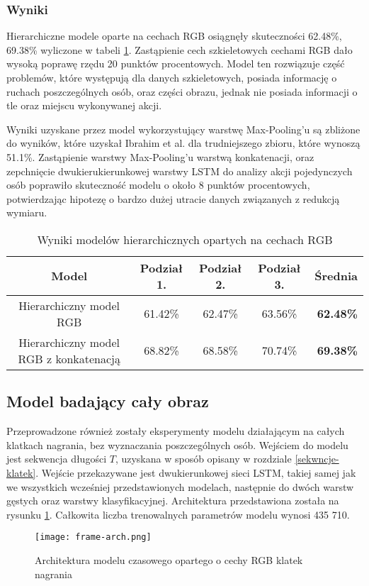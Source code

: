 \subsubsection{Wyniki}
Hierarchiczne modele oparte na cechach RGB osiągnęły skuteczności 62.48\%, 69.38\% wyliczone w tabeli \ref{tab:hier-rgb-wyniki}. Zastąpienie cech szkieletowych cechami RGB dało wysoką poprawę rzędu 20 punktów procentowych. Model ten rozwiązuje część problemów, które występują dla danych szkieletowych, posiada informację o ruchach poszczególnych osób, oraz części obrazu, jednak nie posiada informacji o tle oraz miejscu wykonywanej akcji. 

Wyniki uzyskane przez model wykorzystujący warstwę Max-Pooling'u są zbliżone do wyników, które uzyskał Ibrahim et al. \cite{Ibrahim2015} dla trudniejszego zbioru, które wynoszą 51.1\%. Zastąpienie warstwy Max-Pooling'u warstwą konkatenacji, oraz zepchnięcie dwukierukierunkowej warstwy LSTM do analizy akcji pojedynczych osób poprawiło skuteczność modelu o około 8 punktów procentowych, potwierdzając hipotezę o bardzo dużej utracie danych związanych z redukcją wymiaru. 
\begin{table}[!h] \centering
\caption{Wyniki modelów hierarchicznych opartych na cechach RGB}
\begin{tabular} {| c | c | c | c | r |} \hline
    Model & Podział 1.  & Podział 2. & Podział 3. & \textbf{Średnia} \\ \hline\hline
    Hierarchiczny model RGB &  61.42\%	& 62.47\%	& 63.56\%	& \textbf{62.48\%} \\ \hline
    Hierarchiczny model RGB z konkatenacją &  68.82\%	& 68.58\%	& 70.74\%	& \textbf{69.38\%} \\ \hline
\end{tabular}
\label{tab:hier-rgb-wyniki} 
\end{table}

\subsection{Model badający cały obraz}
Przeprowadzone również zostały eksperymenty modelu działającym na całych klatkach nagrania, bez wyznaczania poszczególnych osób. Wejściem do modelu jest sekwencja długości $T$, uzyskana w sposób opisany w rozdziale \ref{sekwncje-klatek}. Wejście przekazywane jest dwukierunkowej sieci LSTM, takiej samej jak we wszystkich wcześniej przedstawionych modelach, następnie do dwóch warstw gęstych oraz warstwy klasyfikacyjnej. Architektura przedstawiona została na rysunku \ref{fig:frame-arch}. Całkowita liczba trenowalnych parametrów modelu wynosi 435 710. 
\begin{figure}[!h]
    \centering \texttt{[image: frame-arch.png]}
    \caption{Architektura modelu czasowego opartego o cechy RGB klatek nagrania}
    \label{fig:frame-arch}
\end{figure}
